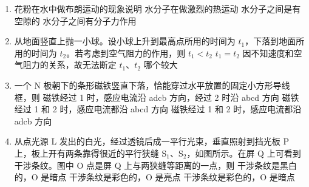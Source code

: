 \documentclass[\gkver]{gaokaozhenti}
\begin{document}
\begin{enumerate}
\item
花粉在水中做布朗运动的现象说明
{水分子在做激烈的热运动}
{水分子之间是有空隙的}
{水分子之间有分子力作用}

\item
从地面竖直上抛一小球。设小球上升到最高点所用的时间为 $t_{1}$，下落到地面所用的时间为 $t_{2}$。若考虑到空气阻力的作用，则
{$t_{1} < t_{2}$}
{$t_{1} = t_{2}$}
{因不知速度和空气阻力的关系，故无法断定 $t_{1}$、$t_{2}$ 哪个较大}

\item
一个 N 极朝下的条形磁铁竖直下落，恰能穿过水平放置的固定小方形导线框，则
{磁铁经过 1 时，感应电流沿 adcb 方向，经过 2 时沿 abcd 方向}
{磁铁经过 1 和 2 时，感应电流都沿 abcd 方向}
{磁铁经过 1 和 2 时，感应电流都沿 adcb 方向}

\item
从点光源 L 发出的白光，经过透镜后成一平行光束，垂直照射到挡光板 P 上，板上开有两条靠得很近的平行狭缝 S$_{1}$、S$_{2}$，如图所示。在屏 Q 上可看到干涉条纹。图中 O 点是屏 Q 上与两狭缝等距离的一点，则
{干涉条纹是黑白的，O 是暗点}
{干涉条纹是彩色的，O 是亮点}
{干涉条纹是彩色的，O 是暗点}


\end{enumerate}
\end{document}
